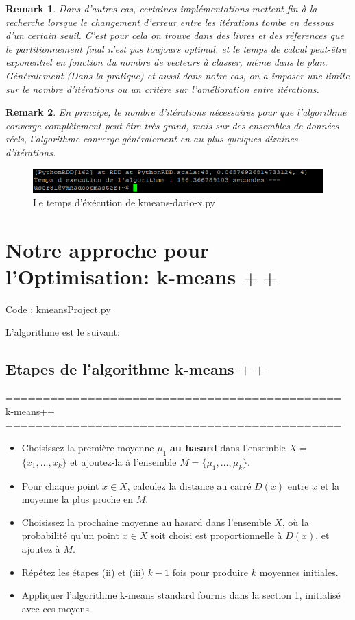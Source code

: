 \documentclass[12pt]{article}
\numberwithin{equation}{section}
\theoremstyle{plain}
\newtheorem{rem}{Remark}
\def\v1{\vskip0.2cm}
\def\no{\noindent}
\def\iti{\item[$(i)$]}
\def\itii{\item[$(ii)$]}
\def\itiii{\item[$(iii)$]}
\def\itiv{\item[$(iv)$]}
\def\itv{\item[$(v)$]}
\def\no{\noindent}
\begin{document}
\begin{rem}
Dans d'autres cas, certaines implémentations mettent fin à la recherche lorsque le changement d'erreur entre les itérations tombe en dessous d'un certain seuil. C'est pour cela on trouve dans des livres et des réferences que le partitionnement final n'est pas toujours optimal. et le temps de calcul peut-être exponentiel en fonction du nombre de vecteurs à classer, même dans le plan. Généralement (Dans la pratique) et aussi dans notre cas, on a imposer une limite sur le nombre d’itérations ou un critère sur l'amélioration entre itérations.
\end{rem}
\begin{rem}
En principe, le nombre d'itérations nécessaires pour que l'algorithme converge complètement peut être très
grand, mais sur des ensembles de données réels, l'algorithme converge généralement en au plus quelques dizaines d'itérations.
\end{rem}

\begin{figure}[H]
\centering
\includegraphics{temp1}
\caption{Le temps d'éxécution de kmeans-dario-x.py
}
\end{figure}

\section{Notre approche pour l'Optimisation: k-means $++$}
\color{blue} Code : kmeansProject.py \color{black}

L'algorithme est le suivant:
\subsection{Etapes de l'algorithme k-means $++$}
\v1\no
=============================================\\
k-means++ \\
=============================================

\begin{itemize}
\iti Choisissez la première moyenne $\mu_1$ \textbf{au hasard} dans l'ensemble $X=$ $\{x_1,\ldots, x_k\}$ et ajoutez-la à l'ensemble $M=\{\mu_1,\ldots, \mu_k\}$.
\itii Pour chaque point $x \in X$, calculez la distance au carré $D (x)$ entre $x$ et la moyenne la plus proche en $M$. 
\itiii Choisissez la prochaine moyenne au hasard dans l'ensemble $X$, où la probabilité qu'un point $x \in X$ soit choisi est proportionnelle à $D (x)$, et ajoutez à $M$.
\itiv Répétez les étapes (ii) et (iii) $ k - 1$ fois pour produire $k$ moyennes initiales.
\itv Appliquer l'algorithme k-means standard fournis dans la section 1, initialisé avec ces moyens
\end{itemize}
\end{document}
